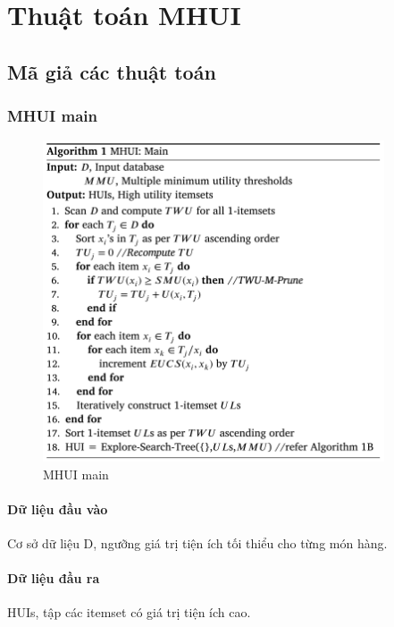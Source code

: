 \section{Thuật toán MHUI}

\subsection{Mã giả các thuật toán}

\subsubsection{MHUI main}

\begin{figure}[h]
\centering
\includegraphics[width=0.9\textwidth]{image/algo/algo1.PNG}
\caption{\label{fig:algo1} MHUI main}
\end{figure}

\paragraph{Dữ liệu đầu vào} Cơ sở dữ liệu D, ngưỡng giá trị tiện ích tối thiểu cho từng món hàng.  
\paragraph{Dữ liệu đầu ra} HUIs, tập các itemset có giá trị tiện ích cao.\\\\



